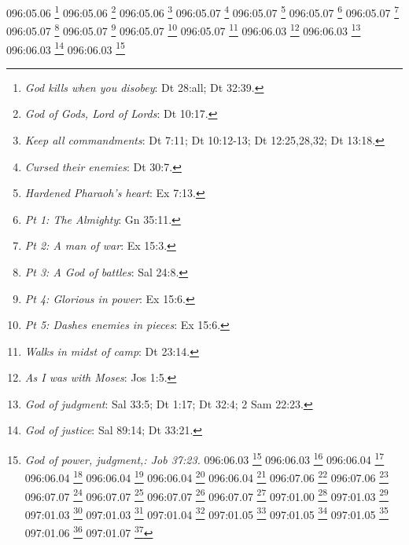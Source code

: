 {{{{{{{{{{{{{{{{096:05.06 \footnote{\textit{God kills when you disobey}: Dt 28:all; Dt 32:39.}
096:05.06 \footnote{\textit{God of Gods, Lord of Lords}: Dt 10:17.}
096:05.06 \footnote{\textit{Keep all commandments}: Dt 7:11; Dt 10:12-13; Dt 12:25,28,32; Dt 13:18.}
096:05.07 \footnote{\textit{Cursed their enemies}: Dt 30:7.}
096:05.07 \footnote{\textit{Hardened Pharaoh's heart}: Ex 7:13.}
096:05.07 \footnote{\textit{Pt 1: The Almighty}: Gn 35:11.}
096:05.07 \footnote{\textit{Pt 2: A man of war}: Ex 15:3.}
096:05.07 \footnote{\textit{Pt 3: A God of battles}: Sal 24:8.}
096:05.07 \footnote{\textit{Pt 4: Glorious in power}: Ex 15:6.}
096:05.07 \footnote{\textit{Pt 5: Dashes enemies in pieces}: Ex 15:6.}
096:05.07 \footnote{\textit{Walks in midst of camp}: Dt 23:14.}
096:06.03 \footnote{\textit{As I was with Moses}: Jos 1:5.}
096:06.03 \footnote{\textit{God of judgment}: Sal 33:5; Dt 1:17; Dt 32:4; 2 Sam 22:23.}
096:06.03 \footnote{\textit{God of justice}: Sal 89:14; Dt 33:21.}
096:06.03 \footnote{\textit{God of power, judgment,: Job 37:23.}
096:06.03 \footnote{\textit{God of power}: Ex 9:15; Esd 8:22; Dt 9:29.}
096:06.03 \footnote{\textit{Yahweh holy, jealous, God}: Jos 24:19.}
096:06.04 \footnote{\textit{Is man more just than God}: Job 4:17.}
096:06.04 \footnote{\textit{Pt 1: Can you find God}: Job 11:7.}
096:06.04 \footnote{\textit{Pt 2: Behold God is great}: Job 36:26.}
096:06.04 \footnote{\textit{Pt 3: Touching the Almighty}: Job 37:23.}
096:06.04 \footnote{\textit{Wicked cannot serve the Lord}: Jos 24:19.}
096:07.06 \footnote{\textit{Disappoints devices of crafty}: Job 5:12-13.}
096:07.06 \footnote{\textit{Sends evil spirits}: Jue 9:23; 1 Sam 16:14-16.}
096:07.07 \footnote{\textit{Elihu, prophet, priest of Salem}: Job 32:2ff.}
096:07.07 \footnote{\textit{He shall pray to God}: Job 33:26.}
096:07.07 \footnote{\textit{Pt 1: Gracious to the repentant}: Job 33:24.}
096:07.07 \footnote{\textit{Pt 2: If any say I sinned}: Job 33:27-28.}
097:01.00 \footnote{\textit{Samuel, first Hebrew prophet}: Hch 3:24.}
097:01.03 \footnote{\textit{Chops in pieces a captive king}: 1 Sam 15:32-33.}
097:01.03 \footnote{\textit{Pillars of the earth are Lord's}: 1 Sam 2:8.}
097:01.03 \footnote{\textit{Rough and ready}: 1 Sam 7:3-4.}
097:01.04 \footnote{\textit{Strength of Israel will not lie}: 1 Sam 15:29.}
097:01.05 \footnote{\textit{Lord will not forsake people}: 1 Sam 12:22.}
097:01.05 \footnote{\textit{Made with us a covenant}: 2 Sam 23:5.}
097:01.05 \footnote{\textit{You are great, O Lord God}: 2 Sam 7:22.}
097:01.06 \footnote{\textit{Lord enriches & impoverishes}: 1 Sam 2:7-8.}
097:01.07 \footnote{\textit{Pt 1: None as holy as Lord}: 1 Sam 2:2.}
}}}}}}}}}}}}}}}}}
